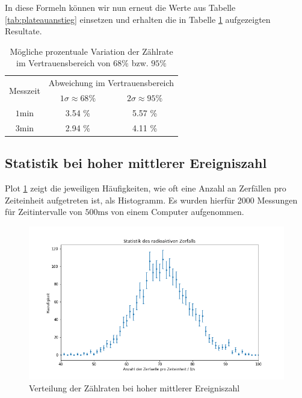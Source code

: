 In diese Formeln können wir nun erneut die Werte aus Tabelle \ref{tab:plateauanstieg} einsetzen und erhalten die in Tabelle \ref{tab:max_sigma_div} aufgezeigten Resultate.

\renewcommand{\arraystretch}{1.3}
\begin{table}[H]
  \centering
  \begin{tabular}{c|c|c}
    \multirow{2}{*}{Messzeit} & \multicolumn{2}{c}{Abweichung im Vertrauensbereich}\\\cline{2-3}
      & $1\sigma \approx 68\%$ & $2\sigma \approx 95\%$\\\hline
      $1\si{\minute}$ & 3.54 \% & 5.57 \% \\\hline
      $3\si{\minute}$ & 2.94 \% & 4.11 \%
  \end{tabular}
  \caption{Mögliche prozentuale Variation der Zählrate im Vertrauensbereich von $68\%$ bzw. $95\%$}
  \label{tab:max_sigma_div}
\end{table}
\renewcommand{\arraystretch}{1}


\newpage\noindent
\subsection{Statistik bei hoher mittlerer Ereigniszahl}

Plot \ref{plot:aufgabe4_data} zeigt die jeweiligen Häufigkeiten, wie oft eine Anzahl an Zerfällen pro Zeiteinheit aufgetreten ist, als Histogramm. Es wurden hierfür 2000 Messungen für Zeitintervalle von $500 \si{\milli\second}$ von einem Computer aufgenommen.

\begin{figure}[H]
  \centering
  \includegraphics[width=.9\textwidth]{files/aufgabe4_data.png}
  \caption{Verteilung der Zählraten bei hoher mittlerer Ereigniszahl}
  \label{plot:aufgabe4_data}
\end{figure}

